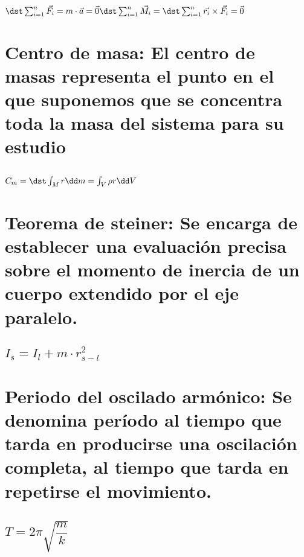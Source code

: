 \documentclass[12pt]{article}
\begin{document}
 \subsection{$\dst\sum^n_{i=1} \vec {F_i}= m \cdot
\vec a=\vec 0

\dst\sum^n_{i=1} \vec {M_i}=
\dst\sum^n_{i=1}
\vec {r_i}\times \vec {F_i} =\vec 0$}
 
\section{Centro de masa: El centro de masas representa el punto en el que suponemos que se concentra toda la masa del sistema para su estudio}

 \subsection{$C_m=\dst \int_M r \dd m=\int_V
\rho r \dd V$}
 
\section{Teorema de steiner: Se encarga de establecer una evaluación precisa sobre el momento de inercia de un cuerpo extendido por el eje paralelo.}

 \subsection{$I_s=I_l+m\cdot r_{s-l}^2$}

\section{Periodo del oscilado armónico: Se denomina período al tiempo que tarda en producirse una oscilación completa, al tiempo que tarda en repetirse el movimiento.  }

 \subsection{$T=2\pi\sqrt{\dfrac{m}{k}}$}
 
\end{document}
